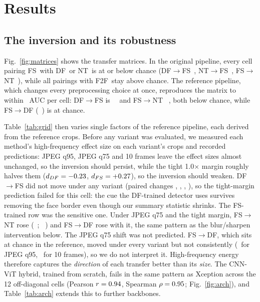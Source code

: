\documentclass[conference]{IEEEtran}
\newcommand{\DF}{DF}
\newcommand{\FF}{F2F}
\newcommand{\FS}{FS}
\newcommand{\NT}{NT}
\newcommand{\tr}[2]{#1$\rightarrow$#2}
\begin{document}
\section{Results}

\subsection{The inversion and its robustness}
Fig.~\ref{fig:matrices} shows the transfer matrices. In the original pipeline,
every cell pairing \FS\ with \DF\ or \NT\ is at or below chance
(\tr{\DF}{\FS}~\curdffs, \tr{\NT}{\FS}~\curntfs, \tr{\FS}{\NT}~\curfsnt),
while all pairings with \FF\ stay above chance. The reference pipeline,
which changes every preprocessing choice at once, reproduces the matrix to
within \ AUC per cell: \tr{\DF}{\FS} is ~\ and
\tr{\FS}{\NT} ~, both below chance, while \tr{\FS}{\DF}
(~) is at chance.

Table~\ref{tab:grid} then varies single factors of the reference pipeline,
each derived from the reference crops. Before any variant was evaluated, we
measured each method's high-frequency effect size on each variant's crops and
recorded predictions: JPEG q95, JPEG q75 and 10 frames leave the effect sizes
almost unchanged, so the inversion should persist, while the tight 1.0$\times$
margin roughly halves them ($d_{\DF}=\gridhfmgdf$, $d_{\FS}=+\gridhfmgfs$), so
the inversion should weaken. \tr{\DF}{\FS} did not move under any variant
(paired changes \griddeltahidffs, \griddeltalodffs, \griddeltafrdffs,
\griddeltamgdffs), so the tight-margin prediction failed for this cell: the
cue the \DF-trained detector uses survives removing the face border even though
our summary statistic shrinks. The \FS-trained row was the sensitive one.
Under JPEG q75 and the tight margin, \tr{\FS}{\NT} rose
(\griddeltalofsnt~\griddeltalofsntci; \griddeltamgfsnt~\griddeltamgfsntci)
and \tr{\FS}{\DF} rose with it, the same pattern as the blur/sharpen
intervention below. The JPEG q75 shift was not predicted. \tr{\FS}{\DF},
which sits at chance in the reference, moved under every variant but not
consistently (\griddeltahifsdf\ for JPEG q95, \griddeltafrfsdf\ for 10
frames), so we do not interpret it. High-frequency
energy therefore captures the \emph{direction} of each transfer better than
its \emph{size}.
The CNN-ViT hybrid, trained from scratch, fails in the same pattern as
Xception across the 12 off-diagonal cells (Pearson $r=0.94$, Spearman
$\rho=0.95$; Fig.~\ref{fig:arch}), and Table~\ref{tab:arch} extends this
to further backbones.
\end{document}
